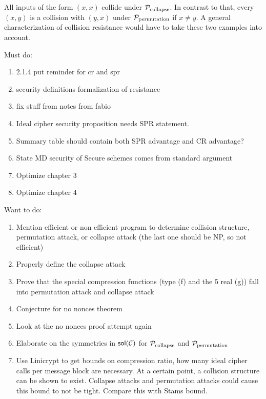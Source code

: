 All inputs of the form $(x,x)$ collide under $\P_{\mathrm{collapse}}$.
In contrast to that, every $(x,y)$ is a collision with $(y,x)$ under $\P_{\mathrm{permutation}}$ if $x \neq y$.
A general characterization of collision resistance would have to take these two examples into account.

\pagebreak

Must do:
\begin{enumerate}
\item 2.1.4 put reminder for cr and spr
\item security definitions formalization of resistance
\item fix stuff from notes from fabio
\item Ideal cipher security proposition needs SPR statement.
\item Summary table should contain both SPR advantage and CR advantage?
\item State MD security of Secure schemes comes from standard argument
\item Optimize chapter 3
\item Optimize chapter 4
\end{enumerate}

Want to do:
\begin{enumerate}
\item Mention efficient or non efficient program to determine collision structure, permutation attack, or collapse attack (the last one should be NP, so not efficient) 
\item Properly define the collapse attack
\item Prove that the special compression functions (type (f) and the 5 real (g)) fall into permutation attack and collapse attack
\item Conjecture for no nonces theorem
\item Look at the no nonces proof attempt again
\item Elaborate on the symmetries in $\sol(\C)$ for $\P_\mathrm{collapse}$ and $\P_\mathrm{permutation}$
\item Use Linicrypt to get bounds on compression ratio, how many ideal cipher calls per message block are necessary.
At a certain point, a collision structure can be shown to exist.
Collapse attacks and permutation attacks could cause this bound to not be tight.
Compare this with Stams bound.
\end{enumerate}
